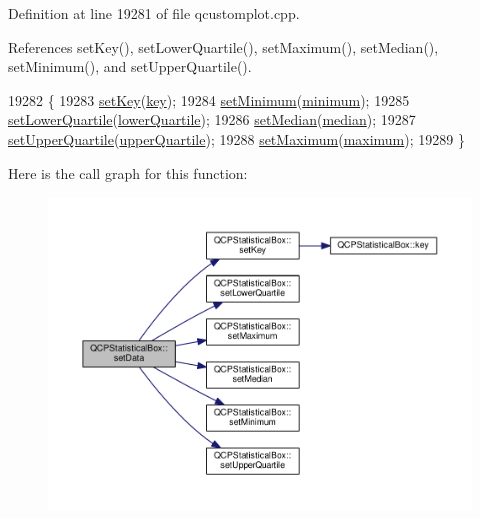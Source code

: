 Definition at line 19281 of file qcustomplot.\+cpp.



References set\+Key(), set\+Lower\+Quartile(), set\+Maximum(), set\+Median(), set\+Minimum(), and set\+Upper\+Quartile().


\begin{DoxyCode}
19282 \{
19283   \hyperlink{class_q_c_p_statistical_box_a84a1c6d34b2f9af40bca0c527d51e97e}{setKey}(\hyperlink{class_q_c_p_statistical_box_a767af754f39872d6308b900a0d1758ca}{key});
19284   \hyperlink{class_q_c_p_statistical_box_a84ff7cc61ba44890f0c3e0c99c19941e}{setMinimum}(\hyperlink{class_q_c_p_statistical_box_acd94c05d59c05d9146d3b60d9f52df82}{minimum});
19285   \hyperlink{class_q_c_p_statistical_box_a680941af5e23d902013962fa67223f9e}{setLowerQuartile}(\hyperlink{class_q_c_p_statistical_box_af9c4a98f5ca95b5a5a8b140f57b64ace}{lowerQuartile});
19286   \hyperlink{class_q_c_p_statistical_box_a65970e77a897da4ecb4b15300868aad3}{setMedian}(\hyperlink{class_q_c_p_statistical_box_a44abdee617fe0bca72e6a2ea3fd492de}{median});
19287   \hyperlink{class_q_c_p_statistical_box_a65a1375f941c5a2077b5201229e89346}{setUpperQuartile}(\hyperlink{class_q_c_p_statistical_box_abd15951907b54343a89b1f7feddcb7a7}{upperQuartile});
19288   \hyperlink{class_q_c_p_statistical_box_acec5ad1901f00f2c5387cfb4d9787eb3}{setMaximum}(\hyperlink{class_q_c_p_statistical_box_a928bcf07dd2176affad91d85be03172f}{maximum});
19289 \}
\end{DoxyCode}


Here is the call graph for this function\+:\nopagebreak
\begin{figure}[H]
\begin{center}
\leavevmode
\includegraphics[width=350pt]{class_q_c_p_statistical_box_adf50c57b635edb12470c0e4a986aff37_cgraph}
\end{center}
\end{figure}


